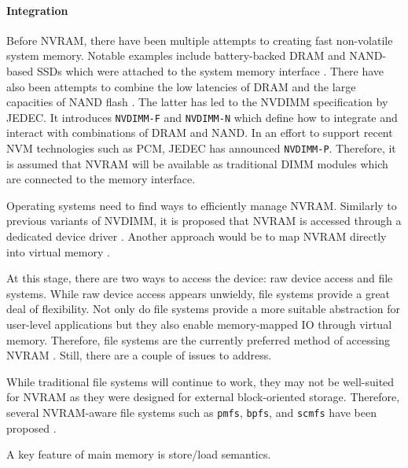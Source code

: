 \paragraph{Integration}

Before \ac{NVRAM}, there have been multiple attempts to creating fast
non-volatile system memory. Notable examples include battery-backed \ac{DRAM}
\cite{molina1992main, condit2009better, bailey2013exploring} and NAND-based
\acp{SSD} which were attached to the system memory interface \cite{wu1994envy,
shi2010write}. There have also been attempts to combine the low latencies of
\ac{DRAM} and the large capacities of NAND flash \cite{oe2016feasibility}. The
latter has led to the \acs{NVDIMM} specification by \ac{JEDEC}. It introduces
\texttt{NVDIMM-F} and \texttt{NVDIMM-N} which define how to integrate and
interact with combinations of \ac{DRAM} and NAND. In an effort to support recent
\ac{NVM} technologies such as \ac{PCM}, \ac{JEDEC} has announced
\texttt{NVDIMM-P}\cite{jedec2017nvdimm}. Therefore, it is assumed that
\ac{NVRAM} will be available as traditional DIMM modules which are connected to
the memory interface.

Operating systems need to find ways to efficiently manage \ac{NVRAM}. Similarly
to previous variants of \ac{NVDIMM}, it is proposed that \ac{NVRAM} is accessed
through a dedicated device driver \cite{intel2017nvdimm}. Another approach would
be to map \ac{NVRAM} directly into virtual memory .

At this stage, there are two ways to access the device: raw device access and
file systems. While raw device access appears unwieldy, file systems provide a
great deal of flexibility. Not only do file systems provide a more suitable
abstraction for user-level applications but they also enable memory-mapped IO
through virtual memory. Therefore, file systems are the currently preferred
method of accessing \ac{NVRAM} \cite{oukid2017data}. Still, there are a couple
of issues to address.

While traditional file systems will continue to work, they may not be
well-suited for \ac{NVRAM} as they were designed for external block-oriented
storage. Therefore, several \ac{NVRAM}-aware file systems such as \texttt{pmfs},
\texttt{bpfs}, and \texttt{scmfs} have been proposed \cite{dulloor2014system,
condit2009better, wu2011scmfs}. 

A key feature of main memory is store/load semantics.


